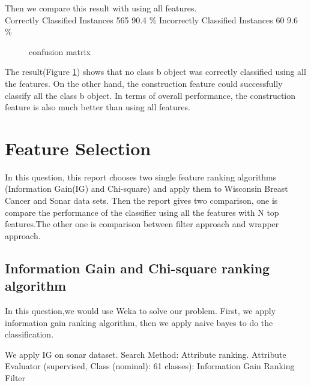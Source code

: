 \documentclass[11pt, a4paper, oneside, openright]{article}
\begin{document}
Then we compare this result with using all features.
\\
\newline Correctly Classified Instances   \hspace * {4mm}      565    \hspace * {4mm}           90.4    \%
\newline Incorrectly Classified Instances  \hspace * {4mm}      60     \hspace * {4mm}           9.6    \%
\\
  \begin{figure}[!ht]
  \centerline{}
  \caption{confusion matrix}
  \label{fig:matrix}
  \end{figure}
\newline The result(Figure \ref{fig:matrix}) shows that no class b object was correctly classified using all the features. On the other hand, the construction feature could successfully classify all the class b object. In terms of overall performance, the construction feature is also much better than using all features.  

\section{Feature Selection}
In this question, this report chooses two single feature ranking algorithms (Information Gain(IG) and Chi-square) and apply them to Wisconsin Breast Cancer and Sonar data sets. Then the report gives two comparison, one is compare the performance of the classifier using all the features with N top features.The other one is comparison between  filter approach and wrapper approach.

\subsection{Information Gain and Chi-square ranking algorithm}
In this question,we would use Weka to solve our problem.
First, we apply information gain ranking algorithm, then we apply naive bayes to do the classification.

We apply IG on sonar dataset.
Search Method:
	Attribute ranking.
Attribute Evaluator (supervised, Class (nominal): 61 classes):
Information Gain Ranking Filter
\end{document}
